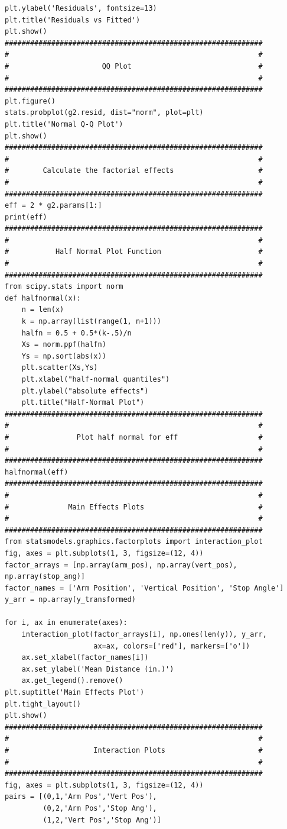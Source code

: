 \documentclass[11pt]{article}
\begin{document}
\begin{verbatim}
plt.ylabel('Residuals', fontsize=13)
plt.title('Residuals vs Fitted')
plt.show()
#############################################################
#                                                           #
#                      QQ Plot                              #
#                                                           #
#############################################################
plt.figure()
stats.probplot(g2.resid, dist="norm", plot=plt)
plt.title('Normal Q-Q Plot')
plt.show()
#############################################################
#                                                           #
#        Calculate the factorial effects                    #
#                                                           #
#############################################################
eff = 2 * g2.params[1:]
print(eff)
#############################################################
#                                                           #
#           Half Normal Plot Function                       #
#                                                           #
#############################################################
from scipy.stats import norm
def halfnormal(x):
    n = len(x)
    k = np.array(list(range(1, n+1)))
    halfn = 0.5 + 0.5*(k-.5)/n
    Xs = norm.ppf(halfn)
    Ys = np.sort(abs(x))
    plt.scatter(Xs,Ys)
    plt.xlabel("half-normal quantiles")
    plt.ylabel("absolute effects")
    plt.title("Half-Normal Plot")
#############################################################
#                                                           #
#                Plot half normal for eff                   #
#                                                           #
#############################################################
halfnormal(eff)
#############################################################
#                                                           #
#              Main Effects Plots                           #
#                                                           #
#############################################################
from statsmodels.graphics.factorplots import interaction_plot
fig, axes = plt.subplots(1, 3, figsize=(12, 4))
factor_arrays = [np.array(arm_pos), np.array(vert_pos), np.array(stop_ang)]
factor_names = ['Arm Position', 'Vertical Position', 'Stop Angle']
y_arr = np.array(y_transformed)

for i, ax in enumerate(axes):
    interaction_plot(factor_arrays[i], np.ones(len(y)), y_arr,
                     ax=ax, colors=['red'], markers=['o'])
    ax.set_xlabel(factor_names[i])
    ax.set_ylabel('Mean Distance (in.)')
    ax.get_legend().remove()
plt.suptitle('Main Effects Plot')
plt.tight_layout()
plt.show()
#############################################################
#                                                           #
#                    Interaction Plots                      #
#                                                           #
#############################################################
fig, axes = plt.subplots(1, 3, figsize=(12, 4))
pairs = [(0,1,'Arm Pos','Vert Pos'),
         (0,2,'Arm Pos','Stop Ang'),
         (1,2,'Vert Pos','Stop Ang')]


\end{verbatim}
\end{document}
